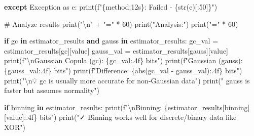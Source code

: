 \documentclass[
  11pt,
  letterpaper,
  oneside,
  openany]{book}
\newenvironment{Shaded}{\begin{snugshade}}{\end{snugshade}}
\newcommand{\BuiltInTok}[1]{\textcolor[rgb]{0.00,0.23,0.31}{#1}}
\newcommand{\CharTok}[1]{\textcolor[rgb]{0.13,0.47,0.30}{#1}}
\newcommand{\CommentTok}[1]{\textcolor[rgb]{0.37,0.37,0.37}{#1}}
\newcommand{\ControlFlowTok}[1]{\textcolor[rgb]{0.00,0.23,0.31}{\textbf{#1}}}
\newcommand{\DecValTok}[1]{\textcolor[rgb]{0.68,0.00,0.00}{#1}}
\newcommand{\ImportTok}[1]{\textcolor[rgb]{0.00,0.46,0.62}{#1}}
\newcommand{\KeywordTok}[1]{\textcolor[rgb]{0.00,0.23,0.31}{\textbf{#1}}}
\newcommand{\NormalTok}[1]{\textcolor[rgb]{0.00,0.23,0.31}{#1}}
\newcommand{\OperatorTok}[1]{\textcolor[rgb]{0.37,0.37,0.37}{#1}}
\newcommand{\PreprocessorTok}[1]{\textcolor[rgb]{0.68,0.00,0.00}{#1}}
\newcommand{\SpecialCharTok}[1]{\textcolor[rgb]{0.37,0.37,0.37}{#1}}
\newcommand{\SpecialStringTok}[1]{\textcolor[rgb]{0.13,0.47,0.30}{#1}}
\newcommand{\StringTok}[1]{\textcolor[rgb]{0.13,0.47,0.30}{#1}}
\begin{document}
\begin{Shaded}
\begin{Highlighting}[]
    \ControlFlowTok{except} \PreprocessorTok{Exception} \ImportTok{as}\NormalTok{ e:}
        \BuiltInTok{print}\NormalTok{(}\SpecialStringTok{f"}\SpecialCharTok{\{}\NormalTok{method}\SpecialCharTok{:12s\}}\SpecialStringTok{: Failed {-} }\SpecialCharTok{\{}\BuiltInTok{str}\NormalTok{(e)[:}\DecValTok{50}\NormalTok{]}\SpecialCharTok{\}}\SpecialStringTok{"}\NormalTok{)}

\CommentTok{\# Analyze results}
\BuiltInTok{print}\NormalTok{(}\StringTok{"}\CharTok{\textbackslash{}n}\StringTok{"} \OperatorTok{+} \StringTok{"="} \OperatorTok{*} \DecValTok{60}\NormalTok{)}
\BuiltInTok{print}\NormalTok{(}\StringTok{"Analysis:"}\NormalTok{)}
\BuiltInTok{print}\NormalTok{(}\StringTok{"="} \OperatorTok{*} \DecValTok{60}\NormalTok{)}

\ControlFlowTok{if} \StringTok{\textquotesingle{}gc\textquotesingle{}} \KeywordTok{in}\NormalTok{ estimator\_results }\KeywordTok{and} \StringTok{\textquotesingle{}gauss\textquotesingle{}} \KeywordTok{in}\NormalTok{ estimator\_results:}
\NormalTok{    gc\_val }\OperatorTok{=}\NormalTok{ estimator\_results[}\StringTok{\textquotesingle{}gc\textquotesingle{}}\NormalTok{][}\StringTok{\textquotesingle{}value\textquotesingle{}}\NormalTok{]}
\NormalTok{    gauss\_val }\OperatorTok{=}\NormalTok{ estimator\_results[}\StringTok{\textquotesingle{}gauss\textquotesingle{}}\NormalTok{][}\StringTok{\textquotesingle{}value\textquotesingle{}}\NormalTok{]}
    \BuiltInTok{print}\NormalTok{(}\SpecialStringTok{f"}\CharTok{\textbackslash{}n}\SpecialStringTok{Gaussian Copula (gc): }\SpecialCharTok{\{}\NormalTok{gc\_val}\SpecialCharTok{:.4f\}}\SpecialStringTok{ bits"}\NormalTok{)}
    \BuiltInTok{print}\NormalTok{(}\SpecialStringTok{f"Gaussian (gauss):     }\SpecialCharTok{\{}\NormalTok{gauss\_val}\SpecialCharTok{:.4f\}}\SpecialStringTok{ bits"}\NormalTok{)}
    \BuiltInTok{print}\NormalTok{(}\SpecialStringTok{f"Difference: }\SpecialCharTok{\{}\BuiltInTok{abs}\NormalTok{(gc\_val }\OperatorTok{{-}}\NormalTok{ gauss\_val)}\SpecialCharTok{:.4f\}}\SpecialStringTok{ bits"}\NormalTok{)}
    \BuiltInTok{print}\NormalTok{(}\StringTok{"}\CharTok{\textbackslash{}n}\StringTok{💡 \textquotesingle{}gc\textquotesingle{} is usually more accurate for non{-}Gaussian data"}\NormalTok{)}
    \BuiltInTok{print}\NormalTok{(}\StringTok{"   \textquotesingle{}gauss\textquotesingle{} is faster but assumes normality"}\NormalTok{)}

\ControlFlowTok{if} \StringTok{\textquotesingle{}binning\textquotesingle{}} \KeywordTok{in}\NormalTok{ estimator\_results:}
    \BuiltInTok{print}\NormalTok{(}\SpecialStringTok{f"}\CharTok{\textbackslash{}n}\SpecialStringTok{Binning: }\SpecialCharTok{\{}\NormalTok{estimator\_results[}\StringTok{\textquotesingle{}binning\textquotesingle{}}\NormalTok{][}\StringTok{\textquotesingle{}value\textquotesingle{}}\NormalTok{]}\SpecialCharTok{:.4f\}}\SpecialStringTok{ bits"}\NormalTok{)}
    \BuiltInTok{print}\NormalTok{(}\StringTok{"✓ Binning works well for discrete/binary data like XOR"}\NormalTok{)}


\end{Highlighting}
\end{Shaded}
\end{document}
